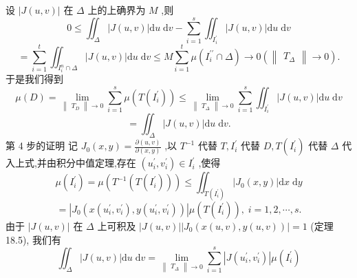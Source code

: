 设 \(\left| {J\left( {u,v}\right) }\right|\) 在 \(\Delta\) 上的上确界为 \(M\) ,则
\[
0 \leq  {\iint }_{\Delta }\left| {J\left( {u,v}\right) }\right| \mathrm{d}u\mathrm{\;d}v - \mathop{\sum }\limits_{{i = 1}}^{s}{\iint }_{{I}_{i}^{\prime }}\left| {J\left( {u,v}\right) }\right| \mathrm{d}u\mathrm{\;d}v
\]
\[
= \mathop{\sum }\limits_{{i = 1}}^{t}{\iint }_{{I}_{i}^{n} \cap  \Delta }\left| {J\left( {u,v}\right) }\right| \mathrm{d}u\mathrm{\;d}v \leq  M\mathop{\sum }\limits_{{i = 1}}^{t}\mu \left( {{I}_{i}^{\prime \prime } \cap  \Delta }\right)  \rightarrow  0\left( {\begin{Vmatrix}{T}_{\Delta }\end{Vmatrix} \rightarrow  0}\right) .
\]
于是我们得到
\[
\mu \left( D\right)  = \mathop{\lim }\limits_{{\begin{Vmatrix}{T}_{D}\end{Vmatrix} \rightarrow  0}}\mathop{\sum }\limits_{{i = 1}}^{s}\mu \left( {T\left( {I}_{i}^{\prime }\right) }\right)  \leq  \mathop{\lim }\limits_{{\begin{Vmatrix}{T}_{\Delta }\end{Vmatrix} \rightarrow  0}}\mathop{\sum }\limits_{{i = 1}}^{s}{\iint }_{{I}_{i}^{\prime }}\left| {J\left( {u,v}\right) }\right| \mathrm{d}u\mathrm{\;d}v
\]
\[
= {\iint }_{\Delta }\left| {J\left( {u,v}\right) }\right| \mathrm{d}u\mathrm{\;d}v.
\]
第 4 步的证明 记 \({J}_{0}\left( {x,y}\right)  = \frac{\partial \left( {u,v}\right) }{\partial \left( {x,y}\right) }\) ,以 \({T}^{-1}\) 代替 \(T,{I}_{i}^{\prime }\) 代替 \(D,T\left( {I}_{i}^{\prime }\right)\) 代替 \(\Delta\) 代入上式,并由积分中值定理,存在 \(\left( {{u}_{i}^{\prime },{v}_{i}^{\prime }}\right)  \in  {I}_{i}^{\prime }\) ,使得
\[
\mu \left( {I}_{i}^{\prime }\right)  = \mu \left( {{T}^{-1}\left( {T\left( {I}_{i}^{\prime }\right) }\right) }\right)  \leq  {\iint }_{T\left( {I}_{i}^{\prime }\right) }\left| {{J}_{0}\left( {x,y}\right) }\right| \mathrm{d}x\mathrm{\;d}y
\]
\[
= \left| {{J}_{0}\left( {x\left( {{u}_{i}^{\prime },{v}_{i}^{\prime }}\right) ,y\left( {{u}_{i}^{\prime },{v}_{i}^{\prime }}\right) }\right) }\right| \mu \left( {T\left( {I}_{i}^{\prime }\right) }\right) ,\;i = 1,2,\cdots ,s.
\]
由于 \(\left| {J\left( {u,v}\right) }\right|\) 在 \(\Delta\) 上可积及 \(\left| {J\left( {u,v}\right) }\right| \left| {{J}_{0}\left( {x\left( {u,v}\right) ,y\left( {u,v}\right) }\right) }\right|  = 1\) (定理 18.5), 我们有
\[
{\iint }_{\Delta }\left| {J\left( {u,v}\right) }\right| \mathrm{d}u\mathrm{\;d}v = \mathop{\lim }\limits_{{\begin{Vmatrix}{T}_{\Delta }\end{Vmatrix} \rightarrow  0}}\mathop{\sum }\limits_{{i = 1}}^{s}\left| {J\left( {{u}_{i}^{\prime },{v}_{i}^{\prime }}\right) }\right| \mu \left( {I}_{i}^{\prime }\right)
\]
